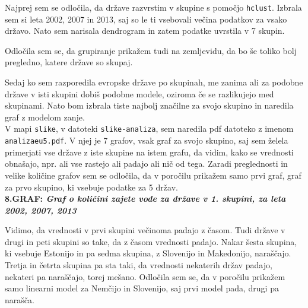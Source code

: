 \documentclass[11pt,a4paper]{article}
\begin{document}
Najprej sem se odločila, da države razvrstim v skupine s pomočjo \verb|hclust|. Izbrala sem si leta 2002, 2007 in 2013, saj so le ti vsebovali večina podatkov za vsako državo. Nato sem narisala dendrogram in zatem podatke uvrstila v 7 skupin.


\newpage
Odločila sem se, da grupiranje prikažem tudi na zemljevidu, da bo še toliko bolj pregledno, katere države so skupaj.


Sedaj ko sem razporedila evropske države po skupinah, me zanima ali za podobne države v isti skupini dobiš podobne modele, oziroma če se razlikujejo med skupinami. Nato bom izbrala tiste najbolj značilne za svojo skupino in naredila graf z modelom zanje.\\

V mapi \verb|slike|, v datoteki \verb|slike-analiza|, sem naredila pdf datoteko z imenom \verb|analizaeu5.pdf|. V njej je 7 grafov, vsak graf za svojo skupino, saj sem želela primerjati vse države z iste skupine na istem grafu, da vidim, kako se vrednosti obnašajo, npr. ali vse rastejo ali padajo ali nič od tega. Zaradi preglednosti in velike količine grafov sem se odločila, da v poročilu prikažem samo prvi graf, graf za prvo skupino, ki vsebuje podatke za 5 držav.\\
\newpage
\textbf{8.GRAF: \emph{Graf o količini zajete vode za države v  1. skupini, za leta 2002, 2007, 2013}}


Vidimo, da vrednosti v prvi skupini večinoma padajo z časom. Tudi države v drugi in peti skupini so take, da z časom vrednosti padajo. Nakar šesta skupina, ki vsebuje Estonijo in pa sedma skupina, z Slovenijo in Makedonijo, naraščajo. Tretja in četrta skupina pa sta taki, da vrednosti nekaterih držav padajo, nekateri pa naraščajo, torej mešano. Odločila sem se, da v poročilu prikažem samo linearni model za Nemčijo in Slovenijo, saj prvi model pada, drugi pa narašča.

\end{document}
